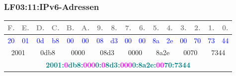 

\begin{frame}[fragile]  
  \frametitle{LF03:11:IPv6-Adressen}
  \vspace{0.2cm}
  \begin{tiny}
  \begin{center}
    \renewcommand{\arraystretch}{2.4}
    \begin{tabular}{|c|c|c|c|c|c|c|c|c|c|c|c|c|c|c|c|}
    \hline
    \textcolor{gray}{\tiny{F.}} & \textcolor{gray}{\tiny{E.}} &
        \textcolor{gray}{\tiny{D.}} & \textcolor{gray}{\tiny{C.}} &
          \textcolor{gray}{\tiny{B.}} & \textcolor{gray}{\tiny{A.}} &
            \textcolor{gray}{\tiny{9.}} & \textcolor{gray}{\tiny{8.}} &
              \textcolor{gray}{\tiny{7.}} & \textcolor{gray}{\tiny{6.}} &
                \textcolor{gray}{\tiny{5.}} & \textcolor{gray}{\tiny{4.}} &
                  \textcolor{gray}{\tiny{3.}} & \textcolor{gray}{\tiny{2.}} &
                   \textcolor{gray}{\tiny{1.}} & \textcolor{gray}{\tiny{0.}} \\
    \hline
    \textcolor{blue}{\tiny{20}} & \textcolor{blue}{\tiny{01}} &
        \textcolor{blue}{\tiny{0d}} & \textcolor{blue}{\tiny{b8}} &
          \textcolor{blue}{\tiny{00}} & \textcolor{blue}{\tiny{00}} &
            \textcolor{blue}{\tiny{08}} & \textcolor{blue}{\tiny{d3}} &
              \textcolor{blue}{\tiny{00}} & \textcolor{blue}{\tiny{00}} &
                \textcolor{blue}{\tiny{8a}} & \textcolor{blue}{\tiny{2e}} &
                  \textcolor{blue}{\tiny{00}} & \textcolor{blue}{\tiny{70}} &
                   \textcolor{blue}{\tiny{73}} & \textcolor{blue}{\tiny{44}} \\
    \hline
    \multicolumn{2}{|c|}{2001} & \multicolumn{2}{c|}{0db8} &
      \multicolumn{2}{c|}{0000} & \multicolumn{2}{c|}{08d3} &
        \multicolumn{2}{c|}{0000} & \multicolumn{2}{c|}{8a2e} &
          \multicolumn{2}{c|}{0070} & \multicolumn{2}{c|}{7344} \\
    \hline
    \multicolumn{16}{|c|}{
      \textcolor{teal}{\footnotesize{\textbf{2001:\textcolor{magenta}{0}db8:\textcolor{magenta}{000}0:\textcolor{magenta}{0}8d3:\textcolor{magenta}{000}0:8a2e:\textcolor{magenta}{00}70:7344}}}} \\

\end{tabular}
\end{center}
\end{tiny}
\end{frame}
